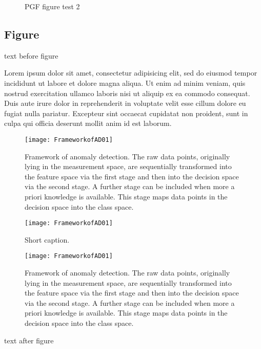\documentclass[10pt,a4paper,extrafontsizes,oldfontcommands,oneside]{memoir}
\begin{document}
\begin{figure}[!htbp]

\caption{PGF figure test 2}
\label{fig:pgftest2}
\end{figure}



\subsection{Figure} %
\label{sub:figure}

text before figure

Lorem ipsum dolor sit amet, consectetur adipisicing elit, sed do eiusmod tempor incididunt ut labore et dolore magna aliqua. Ut enim ad minim veniam, quis nostrud exercitation ullamco laboris nisi ut aliquip ex ea commodo consequat. Duis aute irure dolor in reprehenderit in voluptate velit esse cillum dolore eu fugiat nulla pariatur. Excepteur sint occaecat cupidatat non proident, sunt in culpa qui officia deserunt mollit anim id est laborum.

\begin{figure}[!htbp]
\centering{}\texttt{[image: FrameworkofAD01]} \caption{Framework of anomaly detection. The raw data points, originally lying
in the measurement space, are sequentially transformed into the feature
space via the first stage and then into the decision space via the
second stage. A further stage can be included when more a priori knowledge
is available. This stage maps data points in the decision space into
the class space.}
\label{fig:ADFramework}
\end{figure}

\begin{figure}[!htbp]
\centering{}\texttt{[image: FrameworkofAD01]} \caption{Short caption.}
\label{fig:ADFramework1}
\end{figure}

\begin{figure}[!htbp]
\texttt{[image: FrameworkofAD01]} 
\caption{Framework of anomaly detection. The raw data points, originally lying
in the measurement space, are sequentially transformed into the feature
space via the first stage and then into the decision space via the
second stage. A further stage can be included when more a priori knowledge
is available. This stage maps data points in the decision space into
the class space.}
\label{fig:ADFramework2}
\end{figure}
text after figure
\end{document}
